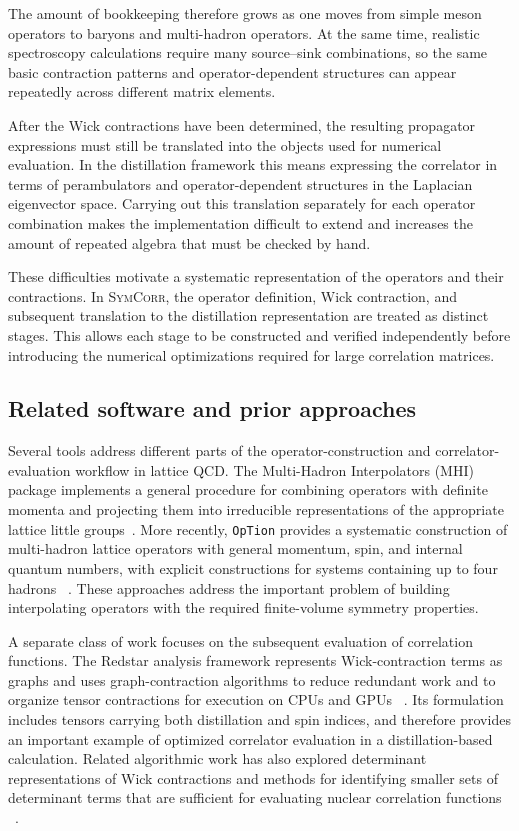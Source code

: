 \documentclass[11pt]{article}
\begin{document}
The amount of bookkeeping therefore grows as one moves from simple meson
operators to baryons and multi-hadron operators. At the same time, realistic
spectroscopy calculations require many source--sink combinations, so the same
basic contraction patterns and operator-dependent structures can appear
repeatedly across different matrix elements.

After the Wick contractions have been determined, the resulting propagator
expressions must still be translated into the objects used for numerical
evaluation. In the distillation framework this means expressing the correlator
in terms of perambulators and operator-dependent structures in the Laplacian
eigenvector space. Carrying out this translation separately for each operator
combination makes the implementation difficult to extend and increases the
amount of repeated algebra that must be checked by hand.

These difficulties motivate a systematic representation of the operators and
their contractions. In \textsc{SymCorr}, the operator definition, Wick
contraction, and subsequent translation to the distillation representation are
treated as distinct stages. This allows each stage to be constructed and
verified independently before introducing the numerical optimizations required
for large correlation matrices.

\subsection{Related software and prior approaches}

Several tools address different parts of the operator-construction and
correlator-evaluation workflow in lattice QCD. The Multi-Hadron Interpolators
(MHI) package implements a general procedure for combining operators with
definite momenta and projecting them into irreducible representations of the
appropriate lattice little groups~\cite{PhysRevD.109.094516}. More recently,
\texttt{OpTion} provides a systematic construction of multi-hadron lattice
operators with general momentum, spin, and internal quantum numbers, with
explicit constructions for systems containing up to four hadrons
~\cite{Yan:2025op}. These approaches address the important problem of building
interpolating operators with the required finite-volume symmetry properties.

A separate class of work focuses on the subsequent evaluation of correlation
functions. The Redstar analysis framework represents Wick-contraction terms as
graphs and uses graph-contraction algorithms to reduce redundant work and to
organize tensor contractions for execution on CPUs and GPUs
~\cite{10.1145/3592979.3593409}. Its formulation includes tensors carrying
both distillation and spin indices, and therefore provides an important example
of optimized correlator evaluation in a distillation-based calculation.
Related algorithmic work has also explored determinant representations of Wick
contractions and methods for identifying smaller sets of determinant terms that
are sufficient for evaluating nuclear correlation functions
~\cite{PhysRevD.110.114505}.
\end{document}
